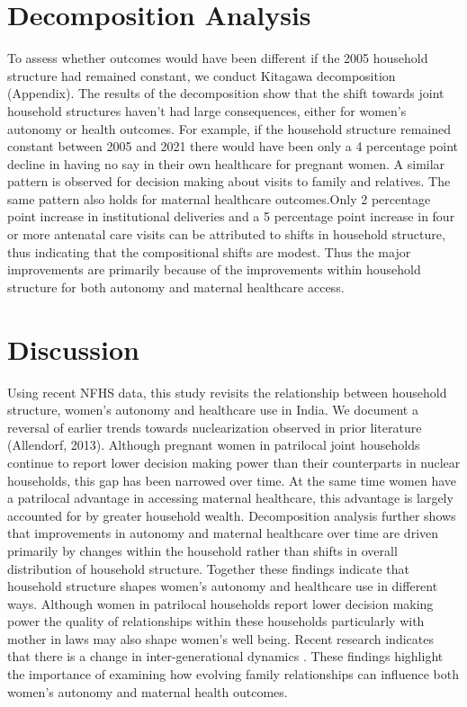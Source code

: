 \documentclass[12pt]{article}
\begin{document}
\section{Decomposition Analysis}

To assess whether outcomes would have been different if the 2005 household structure had remained constant, we conduct Kitagawa decomposition (Appendix). The results of the decomposition show that the shift towards joint household structures haven’t had large consequences, either for women’s autonomy or health outcomes. For example, if the household structure remained constant between 2005 and 2021 there would have been only a 4 percentage point decline in having no say in their own healthcare for pregnant women. A similar pattern is observed for decision making about visits to family and relatives. 
The same pattern also holds for maternal healthcare outcomes.Only 2 percentage point increase in institutional deliveries and a 5 percentage point increase in four or more antenatal care visits can be attributed to shifts in household structure, thus indicating that the compositional shifts are modest. Thus the major improvements are primarily because of the improvements within household structure for both autonomy and maternal healthcare access. 


\section{Discussion}

Using recent NFHS data, this study revisits the relationship between household structure, women’s autonomy and healthcare use in India. We document a reversal of earlier trends towards nuclearization observed in prior literature (Allendorf, 2013).  Although pregnant women in patrilocal joint households continue to report lower decision making power than their counterparts in nuclear households, this gap has been narrowed over time. At the same time women have a patrilocal advantage in accessing maternal healthcare, this advantage is largely accounted for by greater household wealth. 
Decomposition analysis further shows that improvements in autonomy and maternal healthcare over time are driven primarily by changes within the household rather than shifts in overall distribution of household structure. Together these findings indicate that household structure shapes women’s autonomy and healthcare use in different ways.  Although women in patrilocal households report lower decision making power the quality of relationships within these households particularly with mother in laws may also shape women’s well being. Recent research indicates that there is a change in inter-generational dynamics \cite{allendorf2012women}\cite{allendorf2017like}. These findings highlight the importance of examining how evolving family relationships can influence both women’s autonomy and maternal health outcomes. 
\end{document}
